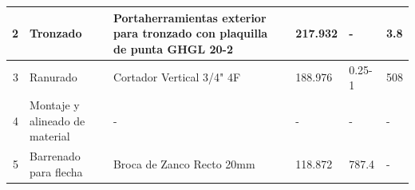 \begin{table}[H]
\begin{tabular}{|r|p{10.75em}|p{11em}|p{3em}|p{3.25em}|p{3.5em}|}
    \scriptsize 2     & \scriptsize Tronzado & \scriptsize Portaherramientas exterior para tronzado con plaquilla de punta GHGL 20-2 & \scriptsize 217.932 & \scriptsize - & \scriptsize 3.8 \\
    \hline
    \scriptsize 3     & \scriptsize Ranurado & \scriptsize Cortador Vertical 3/4" 4F & \scriptsize 188.976 & \scriptsize 0.25-1 & \scriptsize 508 \\
     \hline
    \scriptsize 4     & \scriptsize Montaje y alineado de material & \scriptsize -     & \scriptsize {-} & \scriptsize{-} & \scriptsize {-} \\
    \hline
    \scriptsize 5     & \scriptsize Barrenado para flecha & \scriptsize Broca de Zanco Recto 20mm & \scriptsize 118.872 & \scriptsize 787.4 & \scriptsize - \\
    \hline
    \end{tabular}%
  \label{tab:CO_MC3}%
\end{table}%


 

